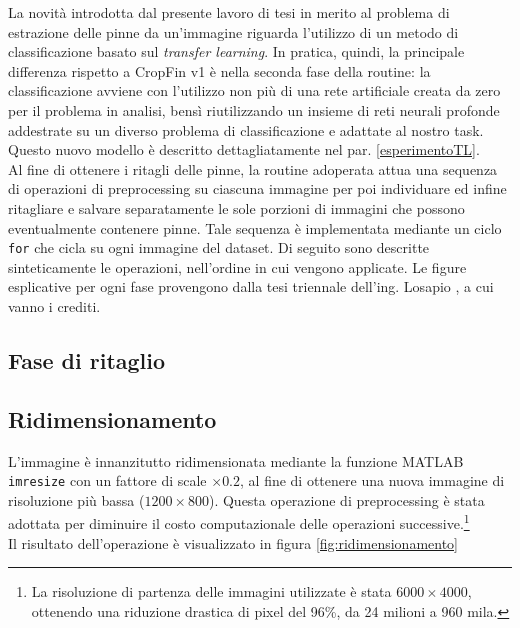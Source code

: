 La novità introdotta dal presente lavoro di tesi in merito al problema di estrazione delle pinne da un'immagine riguarda l'utilizzo di un metodo di classificazione basato sul \textit{transfer learning}. In pratica, quindi, la principale differenza rispetto a CropFin v1 è nella seconda fase della routine: la classificazione avviene con l'utilizzo non più di una rete artificiale creata da zero per il problema in analisi, bensì riutilizzando un insieme di reti neurali profonde addestrate su un diverso problema di classificazione e adattate al nostro task. Questo nuovo modello è descritto dettagliatamente nel par. \ref{esperimentoTL}.\\

Al fine di ottenere i ritagli delle pinne, la routine adoperata attua una sequenza di operazioni di preprocessing su ciascuna immagine per poi individuare ed infine ritagliare e salvare separatamente le sole porzioni di immagini che possono eventualmente contenere pinne. Tale sequenza è implementata mediante un ciclo \verb|for| che cicla su ogni immagine del dataset. Di seguito sono descritte sinteticamente le operazioni, nell'ordine in cui vengono applicate. Le figure esplicative per ogni fase provengono dalla tesi triennale dell'ing. Losapio \cite{gianvito}, a cui vanno i crediti.

\subsection{Fase di ritaglio}
\label{faseRitaglio}

\subsection*{Ridimensionamento}
L'immagine è innanzitutto ridimensionata mediante la funzione MATLAB \verb|imresize| con un fattore di scale $\times 0.2$, al fine di ottenere una nuova immagine di risoluzione più bassa ($1200\times 800$).
Questa operazione di preprocessing è stata adottata per diminuire il costo computazionale delle operazioni successive.\footnote{La risoluzione di partenza delle immagini utilizzate è stata $6000\times 4000$, ottenendo una riduzione drastica di pixel del 96\%, da 24 milioni a 960 mila.}\\

\noindent Il risultato dell'operazione è visualizzato in figura \ref{fig:ridimensionamento}

